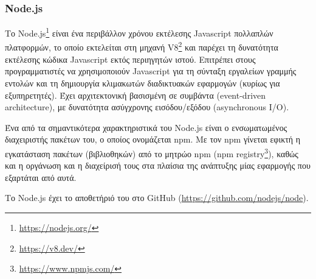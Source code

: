\subsubsection{Node.js} \label{subsection:4-3-1-1-node.js}


Το Node.js\footnote{\url{https://nodejs.org/}} είναι ένα περιβάλλον χρόνου εκτέλεσης Javascript πολλαπλών πλατφορμών, το οποίο εκτελείται στη μηχανή V8\footnote{\url{https://v8.dev/}} και παρέχει τη δυνατότητα εκτέλεσης κώδικα Javascript εκτός περιηγητών ιστού. Επιτρέπει στους προγραμματιστές να χρησιμοποιούν Javascript για τη σύνταξη εργαλείων γραμμής εντολών και τη δημιουργία κλιμακωτών διαδικτυακών εφαρμογών (κυρίως για εξυπηρετητές). Έχει αρχιτεκτονική βασισμένη σε συμβάντα (event-driven architecture), με δυνατότητα ασύγχρονης εισόδου/εξόδου (asynchronous I/O).\cite{4.3-node.js}

Ένα από τα σημαντικότερα χαρακτηριστικά του Node.js είναι ο ενσωματωμένος διαχειριστής πακέτων του, ο οποίος ονομάζεται npm. Με τον npm γίνεται εφικτή η εγκατάσταση πακέτων (βιβλιοθηκών) από το μητρώο npm (npm registry\footnote{\url{https://www.npmjs.com/}}), καθώς και η οργάνωση και η διαχείρισή τους στα πλαίσια της ανάπτυξης μίας εφαρμογής που εξαρτάται από αυτά.

Το Node.js έχει το αποθετήριό του στο GitHub (\url{https://github.com/nodejs/node}).